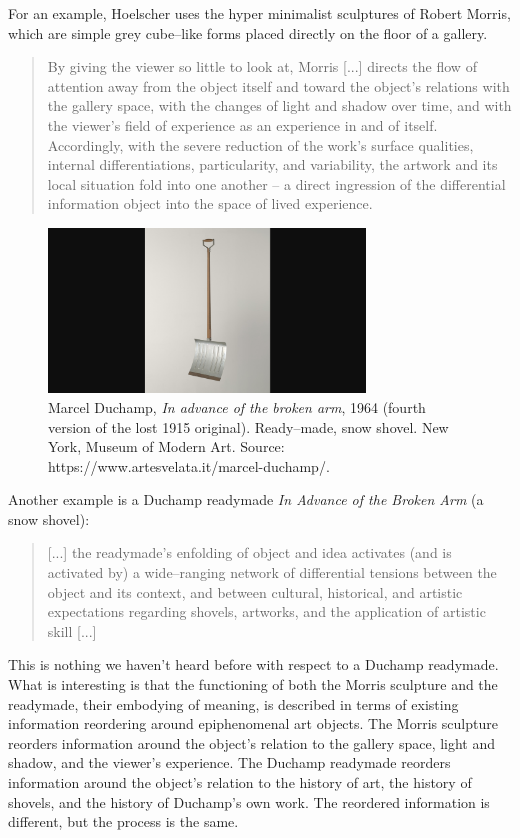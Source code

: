 \documentclass[letterpaper]{article}
\begin{document}
    For an example, Hoelscher uses the hyper minimalist sculptures of Robert Morris, which are simple grey cube–like forms placed directly on the floor of a gallery.

    \begin{quote}
        By giving the viewer so little to look at, Morris [...] directs the flow of attention away from the object itself and toward the object's relations with the gallery space, with the changes of light and shadow over time, and with the viewer's field of experience as an experience in and of itself. Accordingly, with the severe reduction of the work's surface qualities, internal differentiations, particularity, and variability, the artwork and its local situation fold into one another – a direct ingression of the differential information object into the space of lived experience. \citep[p.78]{HoelscherArtAsInfrmtn2021}
    \end{quote}

    \begin{figure}[h]
    \includegraphics[width=3.31in]{snow-shovel.png}
    \caption{Marcel Duchamp, \emph{In advance of the broken arm}, 1964 (fourth version of the lost 1915 original). Ready–made, snow shovel. New York, Museum of Modern Art. Source: https://www.artesvelata.it/marcel-duchamp/.}
    \end{figure}

    Another example is a Duchamp readymade \emph{In Advance of the Broken Arm} (a snow shovel):

    \begin{quote}
        [...] the readymade's enfolding of object and idea activates (and is activated by) a wide–ranging network of differential tensions between the object and its context, and between cultural, historical, and artistic expectations regarding shovels, artworks, and the application of artistic skill [...]
    \end{quote}

    This is nothing we haven't heard before with respect to a Duchamp readymade. What is interesting is that the functioning of both the Morris sculpture and the readymade, their embodying of meaning, is described in terms of existing information reordering around epiphenomenal art objects. The Morris sculpture reorders information around the object's relation to the gallery space, light and shadow, and the viewer's experience. The Duchamp readymade reorders information around the object's relation to the history of art, the history of shovels, and the history of Duchamp's own work. The reordered information is different, but the process is the same.
\end{document}
